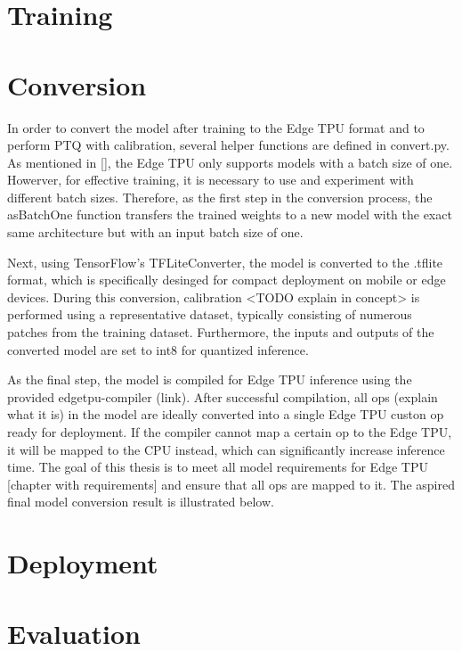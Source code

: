 {\section{Training}

\section{Conversion}

In order to convert the model after training to the Edge TPU format and to perform PTQ with calibration, several helper functions are defined in convert.py. As mentioned in [], the Edge TPU only supports models with a batch size of one. Howerver, for effective training, it is necessary to use and experiment with different batch sizes. Therefore, as the first step in the conversion process, the asBatchOne function transfers the trained weights to a new model with the exact same architecture but with an input batch size of one.

Next, using TensorFlow's TFLiteConverter, the model is converted to the .tflite format, which is specifically desinged for compact deployment on mobile or edge devices. During this conversion, calibration <TODO explain in concept> is performed using a representative dataset, typically consisting of numerous patches from the training dataset. Furthermore, the inputs and outputs of the converted model are set to int8 for quantized inference.

As the final step, the model is compiled for Edge TPU inference using the provided edgetpu-compiler (link). After successful compilation, all ops (explain what it is) in the model are ideally converted into a single Edge TPU custon op ready for deployment. If the compiler cannot map a certain op to the Edge TPU, it will be mapped to the CPU instead, which can significantly increase inference time. The goal of this thesis is to meet all model requirements for Edge TPU [chapter with requirements] and ensure that all ops are mapped to it. The aspired final model conversion result is illustrated below.


\section{Deployment}

\section{Evaluation}


}